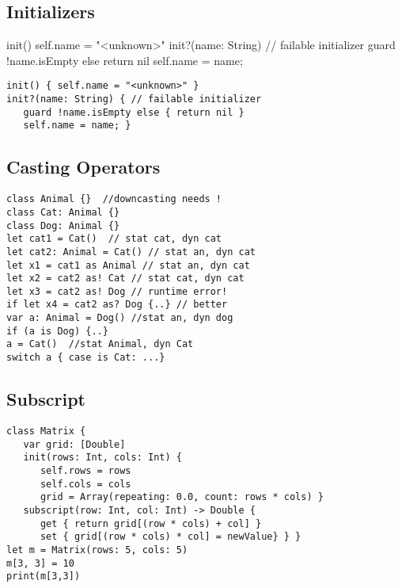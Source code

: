\subsection{Initializers}
init() { self.name = "<unknown>" }
init?(name: String) { // failable initializer
	guard !name.isEmpty else { return nil }
	self.name = name; }
\begin{lstlisting}
init() { self.name = "<unknown>" }
init?(name: String) { // failable initializer
   guard !name.isEmpty else { return nil }
   self.name = name; }
\end{lstlisting}

\subsection{Casting Operators}
\begin{lstlisting}
class Animal {}  //downcasting needs !
class Cat: Animal {}
class Dog: Animal {}
let cat1 = Cat()  // stat cat, dyn cat
let cat2: Animal = Cat() // stat an, dyn cat
let x1 = cat1 as Animal // stat an, dyn cat
let x2 = cat2 as! Cat // stat cat, dyn cat
let x3 = cat2 as! Dog // runtime error!
if let x4 = cat2 as? Dog {..} // better
var a: Animal = Dog() //stat an, dyn dog
if (a is Dog) {..}
a = Cat()  //stat Animal, dyn Cat
switch a { case is Cat: ...}
\end{lstlisting}

\subsection{Subscript}
\begin{lstlisting}
class Matrix {
   var grid: [Double]
   init(rows: Int, cols: Int) {
      self.rows = rows
      self.cols = cols
      grid = Array(repeating: 0.0, count: rows * cols) }
   subscript(row: Int, col: Int) -> Double {
      get { return grid[(row * cols) + col] }
      set { grid[(row * cols) * col] = newValue} } }
let m = Matrix(rows: 5, cols: 5)
m[3, 3] = 10
print(m[3,3])
\end{lstlisting}

